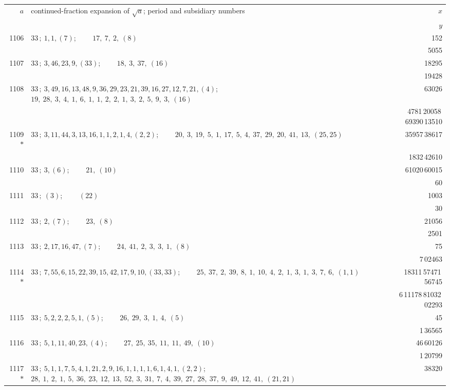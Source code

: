 \documentclass[11pt]{article}
\providecommand{\asterism}{*}
\begin{document}
\renewcommand{\arraystretch}{1.15}
\begin{longtable}{|r|p{}|r|}
\hline
$a$ & continued-fraction expansion of $\sqrt{a}$; period and subsidiary numbers & $x$ \\
 & & $y$ \\
\hline
\endhead
1106 & $33\,;\ 1, 1, (7)$; \ \ \ \ $17,\ 7,\ 2,\ (8)$ & 152 \\
 & & 5055 \\
\hline
1107 & $33\,;\ 3, 46, 23, 9, (33)$; \ \ \ \ $18,\ 3,\ 37,\ (16)$ & 18295 \\
 & & 19428 \\
\hline
1108 & $33\,;\ 3, 49, 16, 13, 48, 9, 36, 29, 23, 21, 39, 16, 27, 12, 7, 21, (4)$; \ \ \ \ $19,\ 28,\ 3,\ 4,\ 1,\ 6,\ 1,\ 1,\ 2,\ 2,\ 1,\ 3,\ 2,\ 5,\ 9,\ 3,\ (16)$ & 63026 \\
 & & 4781\,20058\,69390\,13510 \\
\hline
1109$\asterism$ & $33\,;\ 3, 11, 44, 3, 13, 16, 1, 1, 2, 1, 4, (2, 2)$; \ \ \ \ $20,\ 3,\ 19,\ 5,\ 1,\ 17,\ 5,\ 4,\ 37,\ 29,\ 20,\ 41,\ 13,\ (25, 25)$ & 35957\,38617 \\
 & & 1832\,42610 \\
\hline
1110 & $33\,;\ 3, (6)$; \ \ \ \ $21,\ (10)$ & 61020\,60015 \\
 & & 60 \\
\hline
1111 & $33\,;\ (3)$; \ \ \ \ $(22)$ & 1003 \\
 & & 30 \\
\hline
1112 & $33\,;\ 2, (7)$; \ \ \ \ $23,\ (8)$ & 21056 \\
 & & 2501 \\
\hline
1113 & $33\,;\ 2, 17, 16, 47, (7)$; \ \ \ \ $24,\ 41,\ 2,\ 3,\ 3,\ 1,\ (8)$ & 75 \\
 & & 7\,02463 \\
\hline
1114$\asterism$ & $33\,;\ 7, 55, 6, 15, 22, 39, 15, 42, 17, 9, 10, (33, 33)$; \ \ \ \ $25,\ 37,\ 2,\ 39,\ 8,\ 1,\ 10,\ 4,\ 2,\ 1,\ 3,\ 1,\ 3,\ 7,\ 6,\ (1, 1)$ & 18311\,57471\,56745 \\
 & & 6\,11178\,81032\,02293 \\
\hline
1115 & $33\,;\ 5, 2, 2, 2, 5, 1, (5)$; \ \ \ \ $26,\ 29,\ 3,\ 1,\ 4,\ (5)$ & 45 \\
 & & 1\,36565 \\
\hline
1116 & $33\,;\ 5, 1, 11, 40, 23, (4)$; \ \ \ \ $27,\ 25,\ 35,\ 11,\ 11,\ 49,\ (10)$ & 46\,60126 \\
 & & 1\,20799 \\
\hline
1117$\asterism$ & $33\,;\ 5, 1, 1, 7, 5, 4, 1, 21, 2, 9, 16, 1, 1, 1, 1, 6, 1, 4, 1, (2, 2)$; \ \ \ \ $28,\ 1,\ 2,\ 1,\ 5,\ 36,\ 23,\ 12,\ 13,\ 52,\ 3,\ 31,\ 7,\ 4,\ 39,\ 27,\ 28,\ 37,\ 9,\ 49,\ 12,\ 41,\ (21, 21)$ & 38320 \\

\end{longtable}
\end{document}
